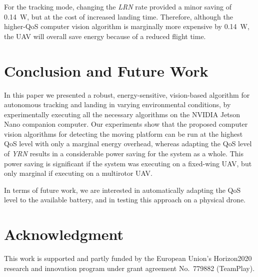 \documentclass[conference]{IEEEtran}
\begin{document}
For the tracking mode, changing the \emph{LRN}
rate
provided a minor saving of \SI{0.14}{\watt}, but at the cost of increased
landing time. Therefore, although the higher-QoS computer vision
algorithm is marginally more expensive by \SI{0.14}{\watt}, the UAV will
overall save energy because of a reduced flight time.

\section{Conclusion and Future Work}
\label{sec:conclusion}

In this paper we presented a robust, energy-sensitive, vision-based
algorithm for autonomous tracking and landing in varying environmental
conditions, by experimentally executing all the necessary algorithms on 
the NVIDIA Jetson Nano companion computer.
%
Our experiments show that the proposed computer vision algorithms for 
detecting the moving platform can be run at the highest QoS level with only a marginal
energy overhead, whereas adapting the QoS level of \emph{YRN}
results in a considerable power saving for the system as a whole. 
This power saving is significant if the system was executing on a fixed-wing UAV, %
but only marginal if executing on a multirotor UAV.

In terms of future work, we are interested in automatically adapting
the QoS level to the available battery, and in testing this approach
on a physical drone.

\section*{Acknowledgment}

This work is supported and partly funded by the European Union’s
Horizon2020 research and innovation program under grant agreement
No.~779882 (TeamPlay).


 
\vspace{1ex}
\end{document}
